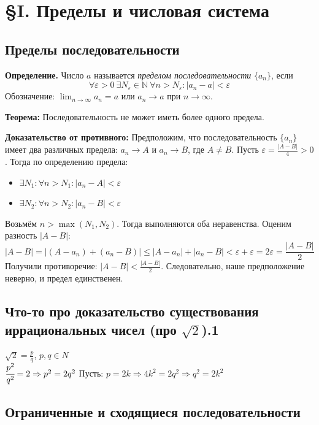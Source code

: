 \documentclass[12pt, paper]{article}
\newcommand{\N}{\mathbb{N}}
\newcommand{\eps}{\varepsilon}
\begin{document}
\section{\S I. Пределы и числовая система}
\subsection{Пределы последовательности}
\begin{tcolorbox}
\textbf{Определение.} Число $a$ называется \textit{пределом последовательности} $\{a_n\}$, если
$$\forall \eps > 0\ \exists N_\eps \in \N\ \forall n > N_\eps: |a_n - a| < \eps$$
Обозначение: $\lim_{n\to\infty} a_n = a$ или $a_n \to a$ при $n \to \infty$.
\end{tcolorbox}

\begin{tcolorbox}[title=Теорема о единственности предела, breakable]

\textbf{Теорема:} Последовательность не может иметь более одного предела.

\textbf{Доказательство от противного:}
Предположим, что последовательность $\{a_n\}$ имеет два различных предела: $a_n \to A$ и $a_n \to B$, где $A \neq B$.
Пусть $\eps = \frac{|A - B|}{4} > 0$. Тогда по определению предела:
\begin{itemize}
    \item $\exists N_1: \forall n > N_1: |a_n - A| < \eps$
    \item $\exists N_2: \forall n > N_2: |a_n - B| < \eps$
\end{itemize}
Возьмём $n > \max(N_1, N_2)$. Тогда выполняются оба неравенства. Оценим разность $|A - B|$:
$$|A - B| = |(A - a_n) + (a_n - B)| \leq |A - a_n| + |a_n - B| < \eps + \eps = 2\eps = \frac{|A - B|}{2}$$
Получили противоречие: $|A - B| < \frac{|A - B|}{2}$. Следовательно, наше предположение неверно, и предел единственен.
\end{tcolorbox}

\subsection{Что-то про доказательство существования иррациональных чисел (про $\sqrt{2}$).1}

$\sqrt{2} = \frac{p}{q}$, $p, q \in N$\\
$\cfrac{p^2}{q^2} = 2 \Rightarrow p^2 = 2q^2$ Пусть: $p = 2k \Rightarrow 4k^2 = 2q^2 \Rightarrow q^2 = 2k^2$

\newpage
\subsection{Ограниченные и сходящиеся последовательности}
\end{document}
